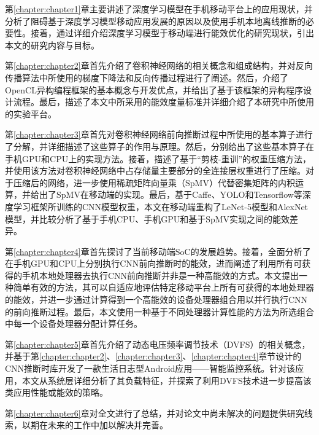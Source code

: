 第\ref{chapter:chapter1}章主要讲述了深度学习模型在手机移动平台上的应用现状，并分析了阻碍基于深度学习模型移动应用发展的原因以及使用手机本地离线推断的必要性。接着，通过详细介绍深度学习模型于移动端进行能效优化的研究现状，引出本文的研究内容与目标。

第\ref{chapter:chapter2}章首先介绍了卷积神经网络的相关概念和组成结构，并对反向传播算法中所使用的梯度下降法和反向传播过程进行了阐述。然后，介绍了OpenCL异构编程框架的基本概念与开发优点，并给出了基于该框架的异构程序设计流程。最后，描述了本文中所采用的能效度量标准并详细介绍了本研究中所使用的实验平台。

第\ref{chapter:chapter3}章首先对卷积神经网络前向推断过程中所使用的基本算子进行了分解，并详细描述了这些算子的作用与原理。然后，分别给出了这些基本算子在手机GPU和CPU上的实现方法。接着，描述了基于“剪枝-重训”的权重压缩方法，并使用该方法对卷积神经网络中占存储量主要部分的全连接层权重进行了压缩。对于压缩后的网络，进一步使用稀疏矩阵向量乘（SpMV）代替密集矩阵的内积运算，并给出了SpMV在移动端的实现。最后，基于Caffe、YOLO和Tensorflow等深度学习框架所训练的CNN模型权重，本文在移动端重构了LeNet-5\cite{lecun1998gradient}模型和AlexNet模型，并比较分析了基于手机CPU、手机GPU和基于SpMV实现之间的能效差异。

第\ref{chapter:chapter4}章首先探讨了当前移动端SoC的发展趋势。接着，全面分析了在手机GPU和CPU上分别执行CNN前向推断时的能效，进而阐述了利用所有可获得的手机本地处理器去执行CNN前向推断并非是一种高能效的方式。本文提出一种简单有效的方法，其可以自适应地评估特定移动平台上所有可获得的本地处理器的能效，并进一步通过计算得到一个高能效的设备处理器组合用以并行执行CNN的前向推断过程\cite{wang2017rethinking}。最后，本文使用一种基于不同处理器计算性能的方法为所选组合中每一个设备处理器分配计算任务。

第\ref{chapter:chapter5}章首先介绍了动态电压频率调节技术（DVFS）的相关概念，并基于第\ref{chapter:chapter2}、\ref{chapter:chapter3}、\ref{chapter:chapter4}章节设计的CNN推断时库开发了一款生活日志型Android应用——智能监控系统。针对该应用，本文从系统层详细分析了其负载特征，并探索了利用DVFS技术进一步提高该类应用性能或能效的策略。

第\ref{chapter:chapter6}章对全文进行了总结，并对论文中尚未解决的问题提供研究线索，以期在未来的工作中加以解决并完善。

\cleardoublepage 
